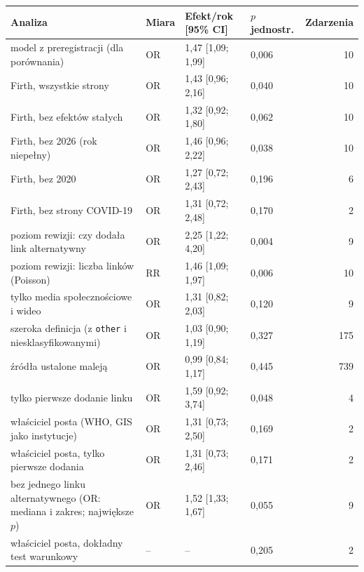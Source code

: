 \begin{tabular}{p{6.4cm}lllr}
\toprule
Analiza & Miara & Efekt/rok [95\% CI] & $p$ jednostr. & Zdarzenia \\
\midrule
model z preregistracji (dla porównania) & OR & 1{,}47 [1{,}09; 1{,}99] & 0{,}006 & 10 \\
\midrule
Firth, wszystkie strony & OR & 1{,}43 [0{,}96; 2{,}16] & 0{,}040 & 10 \\
Firth, bez efektów stałych & OR & 1{,}32 [0{,}92; 1{,}80] & 0{,}062 & 10 \\
Firth, bez 2026 (rok niepełny) & OR & 1{,}46 [0{,}96; 2{,}22] & 0{,}038 & 10 \\
Firth, bez 2020 & OR & 1{,}27 [0{,}72; 2{,}43] & 0{,}196 & 6 \\
Firth, bez strony COVID-19 & OR & 1{,}31 [0{,}72; 2{,}48] & 0{,}170 & 2 \\
poziom rewizji: czy dodała link alternatywny & OR & 2{,}25 [1{,}22; 4{,}20] & 0{,}004 & 9 \\
poziom rewizji: liczba linków (Poisson) & RR & 1{,}46 [1{,}09; 1{,}97] & 0{,}006 & 10 \\
tylko media społecznościowe i wideo & OR & 1{,}31 [0{,}82; 2{,}03] & 0{,}120 & 9 \\
szeroka definicja (z \texttt{other} i niesklasyfikowanymi) & OR & 1{,}03 [0{,}90; 1{,}19] & 0{,}327 & 175 \\
źródła ustalone maleją & OR & 0{,}99 [0{,}84; 1{,}17] & 0{,}445 & 739 \\
\midrule
tylko pierwsze dodanie linku & OR & 1{,}59 [0{,}92; 3{,}74] & 0{,}048 & 4 \\
właściciel posta (WHO, GIS jako instytucje) & OR & 1{,}31 [0{,}73; 2{,}50] & 0{,}169 & 2 \\
właściciel posta, tylko pierwsze dodania & OR & 1{,}31 [0{,}73; 2{,}46] & 0{,}171 & 2 \\
bez jednego linku alternatywnego (OR: mediana i zakres; największe $p$) & OR & 1{,}52 [1{,}33; 1{,}67] & 0{,}055 & 9 \\
właściciel posta, dokładny test warunkowy & -- & -- & 0{,}205 & 2 \\
\bottomrule
\end{tabular}
